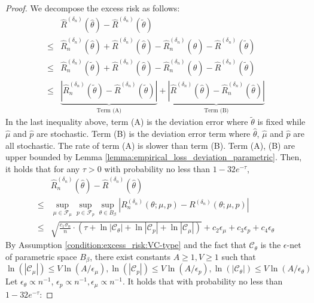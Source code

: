 \begin{proof}
 We decompose the excess risk as follows:
    \begin{align*}
   &\widehat R^{({\delta_n})}(\widehat\theta) - \widehat R^{({\delta_n})}(\tilde\theta)\\
   \leq & \widehat R_n^{({\delta_n})}(\widehat\theta)+\widehat R^{({\delta_n})}(\widehat\theta)  - \widehat R_n^{({\delta_n})}(\widehat\theta) - \widehat R^{({\delta_n})}(\tilde\theta)\\
   \leq & \widehat R_n^{({\delta_n})}(\tilde\theta)+\widehat R^{({\delta_n})}(\widehat\theta)  - \widehat R_n^{({\delta_n})}(\widehat\theta) - \widehat R^{({\delta_n})}(\tilde\theta)\\
   \leq & \underbrace{\left|\widehat R_n^{({\delta_n})}(\tilde\theta) - \widehat R^{({\delta_n})}(\tilde\theta)\right|}_{\text{Term (A)}} + \underbrace{
   \left|\widehat R^{({\delta_n})}(\widehat\theta)
     -\widehat R_n^{({\delta_n})}(\widehat\theta)\right|}_{\text{Term  (B)}}
\end{align*}
In the last inequality above, term (A) is the deviation error where $\tilde\theta$ is fixed while $\widehat \mu$ and $\widehat p$ are stochastic. Term (B) is the deviation error term where  $\widehat\theta$, $\widehat \mu$ and $\widehat p$ are all stochastic. The rate of term (A) is slower than term (B). Term (A), (B) are upper bounded by Lemma \ref{lemma:empirical_loss_deviation_parametric}. Then, it holds that for any $\tau>0$ with probability no less than $1-32e^{-\tau}$,
\begin{align*}
   &\widehat R_n^{({\delta_n})}(\widehat\theta) - \widehat R^{({\delta_n})}(\widehat\theta)\\
   \leq &\sup_{\mu\in\mathcal{F}_\mu}\sup_{p\in\mathcal{F}_p}\sup_{\theta\in B_{\beta}}\left| R_n^{({\delta_n})}(\theta;\mu,p) - R^{({\delta_n})}(\theta;\mu,p)\right|\\
    \leq &\sqrt{\frac{ c_1\sigma_n}{n}\cdot\left(\tau +\ln|\mathcal{C}_\theta|+\ln|\mathcal{C}_p|+\ln|\mathcal{C}_\mu|\right)} + c_2\epsilon_\mu + c_3\epsilon_p + c_4\epsilon_\theta
\end{align*}
By Assumption \ref{condition:excess_risk:VC-type} and the fact that $\mathcal{C}_\theta$ is the $\epsilon$-net of parametric space $B_\beta$, there exist constants $A\geq 1, V\geq 1$ such that $$\ln(|\mathcal{C}_\mu|)\leq V\ln\left(A/\epsilon_\mu\right),\ln(|\mathcal{C}_p|)\leq V\ln\left(A/\epsilon_p\right),\ln(|\mathcal{C}_\theta|)\leq V\ln\left(A/\epsilon_\theta\right)$$
Let $\epsilon_\theta \propto n^{-1}$, $\epsilon_p \propto n^{-1}, \epsilon_\mu\propto n^{-1}$. It holds that with probability no less than $1-32e^{-\tau}$:

\end{proof}
